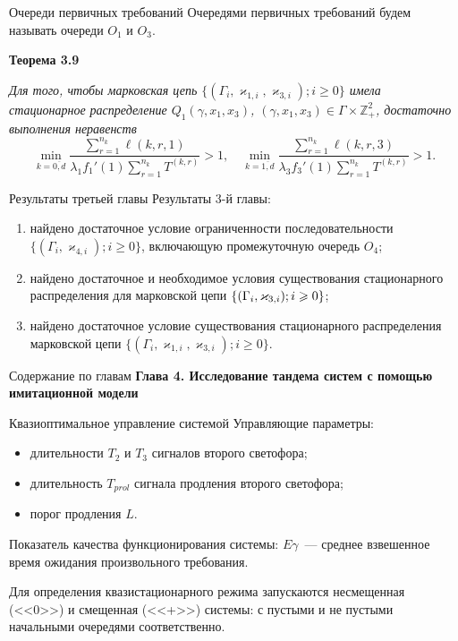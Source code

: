 \documentclass[10pt]{beamer}
\newcommand*{\hm}[1]{#1\nobreak\discretionary{}%
	{\hbox{$\mathsurround=0pt #1$}}{}}%
\newcommand{\MarkThree}{\{(\Gamma_i, \varkappa_{3,i}); \hm{} i \geqslant 0\}}
\begin{document}
\begin{frame}{Очереди первичных требований}
Очередями первичных требований будем называть очереди $O_1$ и $O_3$.
\vfill

 {\bf Теорема 3.9}
{\it 
Для того, чтобы марковская цепь $\{(\Gamma_i, \varkappa_{1,i},\varkappa_{3,i}); i \geqslant 0\}$ имела стационарное распределение $Q_1(\gamma,x_1,x_3)$, $(\gamma,x_1,x_3)\in \Gamma \times {\mathbb Z}^2_+$, достаточно выполнения неравенств
\begin{equation}
\min_{k=\overline{0,d}} { \frac{\sum_{r = 1}^{n_k} \ell(k,r,1) }{\lambda_1 f_1'(1) \sum_{r=1}^{n_k} T^{(k,r)} }}>1, \quad 
\min_{k=\overline{1,d}} { \frac{\sum_{r = 1}^{n_k} \ell(k,r,3) }{\lambda_3 f_3'(1) \sum_{r=1}^{n_k} T^{(k,r)} }}>1.
\label{sufficient:double}
\end{equation}

}
\end{frame}


\begin{frame}{Результаты третьей главы}
Результаты 3-й главы:
\begin{enumerate}
    \item найдено достаточное условие ограниченности последовательности $\{(\Gamma_i, \varkappa_{4,i}); i \geqslant 0\}$, включающую промежуточную очередь $O_4$;
    \item найдено достаточное и необходимое условия существования стационарного распределения для марковской цепи $\MarkThree$;
    \item найдено достаточное условие существования стационарного распределения марковской цепи $\{(\Gamma_i, \varkappa_{1,i},\varkappa_{3,i}); i \geqslant 0\}$.
\end{enumerate}

\end{frame}


  \begin{frame}{Содержание по главам}
  \Large{\textbf{Глава 4. Исследование тандема систем с помощью имитационной модели}}\par
\end{frame}

\begin{frame}{Квазиоптимальное управление системой}
    Управляющие параметры:
    
    \begin{itemize}
        \item длительности $T_2$ и $T_3$ сигналов второго светофора;
        \item длительность $T_{prol}$ сигнала продления второго светофора;
        \item порог продления $L$.
    \end{itemize}
    
    Показатель качества функционирования системы: $E \gamma$~--- среднее взвешенное время ожидания произвольного требования.
    
    Для определения квазистационарного режима запускаются несмещенная (<<0>>) и смещенная (<<+>>) системы: с пустыми и не пустыми начальными очередями соответственно. 
\end{frame}
\end{document}
